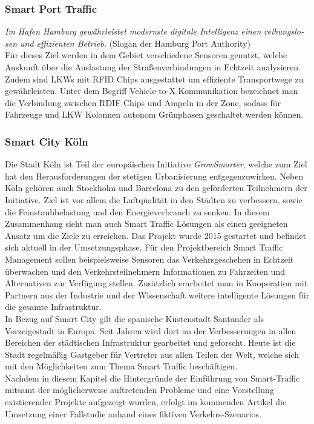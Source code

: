 \subsubsection{Smart Port Traffic}
\emph{Im Ha­fen Ham­burg ge­währ­leis­tet mo­derns­te di­gi­ta­le In­tel­li­genz ei­nen rei­bungs­lo­sen und ef­fi­zi­en­ten Be­trieb.} (Slogan der Hamburg Port Authority)\\
Für dieses Ziel werden in dem Gebiet verschiedene Sensoren genutzt, welche  Auskunft über die Auslastung der Straßenverbindungen in Echtzeit analysieren. Zudem sind LKWs mit RFID Chips ausgestattet um effiziente Transportwege zu gewährleisten. Unter dem Begriff Vehicle-to-X Kommunikation bezeichnet man die Verbindung zwischen RDIF Chips und Ampeln in der Zone, sodass für Fahrzeuge und LKW Kolonnen autonom Grünphasen geschaltet werden können.

\subsubsection{Smart City Köln}
Die Stadt Köln ist Teil der europäischen Initiative \emph{GrowSmarter}, welche zum Ziel hat den Herausforderungen der stetigen Urbanisierung entgegenzuwirken. Neben Köln gehören auch Stockholm und Barcelona zu den geförderten Teilnehmern der Initiative. Ziel ist vor allem die Luftqualität in den Städten zu verbessern, sowie die Feinstaubbelastung und den Energieverbrauch zu senken. In diesem Zusammenhang sieht man auch Smart Traffic Lösungen als einen geeigneten Ansatz um die Ziele zu erreichen. Das Projekt wurde 2015 gestartet und befindet sich aktuell in der Umsetzungsphase. Für den Projektbereich Smart Traffic Management sollen beispielsweise Sensoren das Verkehrsgeschehen in Echtzeit überwachen und den Verkehrsteilnehmern Informationen zu Fahrzeiten und Alternativen zur Verfügung stellen. Zusätzlich erarbeitet man in Kooperation mit Partnern aus der Industrie und der Wissenschaft weitere intelligente Lösungen für die gesamte Infrastruktur.\\
In Bezug auf Smart City gilt die spanische Küstenstadt Santander als Vorzeigestadt in Europa. Seit Jahren wird dort an der Verbesserungen in allen Bereichen der städtischen Infrastruktur gearbeitet und geforscht. Heute ist die Stadt regelmäßig Gastgeber für Vertreter aus allen Teilen der Welt, welche sich mit den Möglichkeiten zum Thema Smart Traffic beschäftigen.\\

Nachdem in diesem Kapitel die Hintergründe der Einführung von Smart-Traffic mitsamt der möglicherweise auftretenden Probleme und eine Vorstellung existierender Projekte aufgezeigt wurden, erfolgt im kommenden Artikel die Umsetzung einer Fallstudie anhand eines fiktiven Verkehrs-Szenarios.


\clearpage
